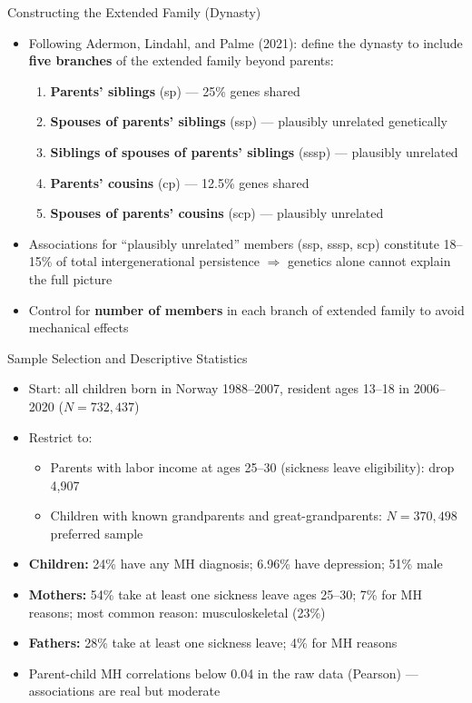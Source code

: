 \documentclass[aspectratio=169]{beamer}
\begin{document}
\begin{frame}{Constructing the Extended Family (Dynasty)}
  \begin{itemize}
    \item Following Adermon, Lindahl, and Palme (2021): define the dynasty to include \textbf{five branches} of the extended family beyond parents:
    \begin{enumerate}
      \item \textbf{Parents' siblings} (sp) --- 25\% genes shared
      \item \textbf{Spouses of parents' siblings} (ssp) --- plausibly unrelated genetically
      \item \textbf{Siblings of spouses of parents' siblings} (sssp) --- plausibly unrelated
      \item \textbf{Parents' cousins} (cp) --- 12.5\% genes shared
      \item \textbf{Spouses of parents' cousins} (scp) --- plausibly unrelated
    \end{enumerate}
    \item Associations for ``plausibly unrelated'' members (ssp, sssp, scp) constitute 18--15\% of total intergenerational persistence $\Rightarrow$ genetics alone cannot explain the full picture
    \item Control for \textbf{number of members} in each branch of extended family to avoid mechanical effects
  \end{itemize}
\end{frame}

\begin{frame}{Sample Selection and Descriptive Statistics}
  \begin{itemize}
    \item Start: all children born in Norway 1988--2007, resident ages 13--18 in 2006--2020 ($N = 732{,}437$)
    \item Restrict to:
    \begin{itemize}
      \item Parents with labor income at ages 25--30 (sickness leave eligibility): drop 4,907
      \item Children with known grandparents and great-grandparents: $N = 370{,}498$ preferred sample
    \end{itemize}
    \item \textbf{Children:} 24\% have any MH diagnosis; 6.96\% have depression; 51\% male
    \item \textbf{Mothers:} 54\% take at least one sickness leave ages 25--30; 7\% for MH reasons; most common reason: musculoskeletal (23\%)
    \item \textbf{Fathers:} 28\% take at least one sickness leave; 4\% for MH reasons
    \item Parent-child MH correlations below 0.04 in the raw data (Pearson) --- associations are real but moderate
  \end{itemize}
\end{frame}
\end{document}
